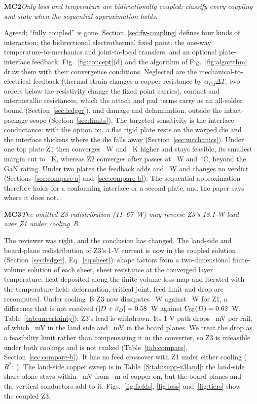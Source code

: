 \documentclass[10pt]{article}
\newcommand{\rc}[2]{\par\medskip\noindent\textbf{#1}\enspace\emph{#2}\par\smallskip\noindent}
\newcommand{\degC}{\,$^\circ$C}
\begin{document}
\rc{MC2}{Only loss and temperature are bidirectionally coupled; classify every coupling and state
when the sequential approximation holds.}
Agreed; ``fully coupled'' is gone. Section~\ref{sec:fw-coupling} defines four kinds of interaction:
the bidirectional electrothermal fixed point, the one-way temperature-to-mechanics and
joint-to-local transfers, and an optional plate-interface feedback. Fig.~\ref{fig:concept}(d) and the
algorithm of Fig.~\ref{fig:algorithm} draw them with their convergence conditions. Neglected are the
mechanical-to-electrical feedback (thermal strain changes a copper resistance by
$\alpha_{\mathrm{Cu}}\Delta T$, two orders below the resistivity change the fixed point carries),
contact and intermetallic resistances, which the attach and pad terms carry as an all-solder bound
(Section~\ref{sec:ledger}), and damage and delamination, outside the intact-package scope
(Section~\ref{sec:limits}). The targeted sensitivity is the interface conductance: with the option
on, a flat rigid plate rests on the warped die and the interface thickens where the die falls away
(Section~\ref{sec:mechanics}). Under one top plate Z1 then converges \FbAZonedP~W and \FbAZonedT~K
higher and stays feasible, its smallest margin cut to \WrFbAZoneRonMargin~K, whereas Z2 converges
after \FbAZtwoItersWord{} passes at \FbAZtwoPloss~W and \FbAZtwoTmax\degC, beyond the GaN rating. Under
two plates the feedback adds \FbBZonedP{} and \FbBZtwodP~W and changes no verdict
(Sections~\ref{sec:compare-a} and~\ref{sec:compare-b}). The sequential approximation therefore holds
for a conforming interface or a second plate, and the paper says where it does not.

\rc{MC3}{The omitted Z3 redistribution (11--67~W) may reverse Z3's 18.1-W lead over Z1 under
cooling~B.}
The reviewer was right, and the conclusion has changed. The land-side and board-plane redistribution
of Z3's 1-V current is now in the coupled solution (Section~\ref{sec:ledger}, Eq.~\eqref{eq:sheet}):
shape factors from a two-dimensional finite-volume solution of each sheet, sheet resistance at the
converged layer temperature, heat deposited along the finite-volume loss map and iterated with the
temperature field; deformation, critical joint, feed limit and drop are recomputed. Under cooling~B
Z3 now dissipates \PlossBZthree~W against \PlossBZone~W for Z1, a difference that is not resolved
($|D+\beta_D| = 0.58$~W against $U_{95}(D) = 0.62$~W,
Table~\ref{tab:uncertainty}): Z3's lead is withdrawn. Its 1-V path drops \VdropBZthree~mV per rail,
of which \VdropLandBZthree~mV in the land side and \VdropPlanesBZthree~mV in the board planes. We treat
the drop as a feasibility limit rather than compensating it in the converter, so Z3 is infeasible
under both coolings and is not ranked (Table~\ref{tab:compare}, Section~\ref{sec:compare-b}). It has
no feed crossover with Z1 under either cooling ($R^*$: \RstarTierBZthree). The land-side copper
sweep is in Table~\ref{S:tab:supp-z3land}: the land-side share alone stays within \MthLimDrop~mV from
\ZthreeLandThirtyMv~\textmu m of copper on, but the board planes and the vertical conductors add to
it. Figs.~\ref{fig:fields}, \ref{fig:loss}
and~\ref{fig:tiers} show the coupled Z3.
\end{document}
